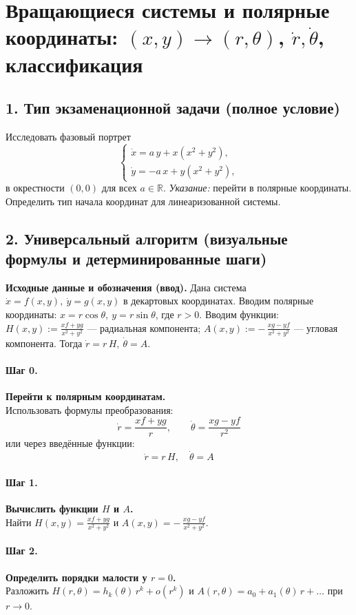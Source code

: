 \section{Вращающиеся системы и полярные координаты: \((x,y)\to(r,\theta)\), \(\dot r,\dot\theta\), классификация}

\subsection*{1. Тип экзаменационной задачи (полное условие)}
Исследовать фазовый портрет
\[
\begin{cases}
\dot{x}=a\,y+x(x^{2}+y^{2}),\\
\dot{y}=-a\,x+y(x^{2}+y^{2}),
\end{cases}
\]
в окрестности \((0,0)\) для всех \(a\in\mathbb R\). \textit{Указание:} перейти в полярные координаты. Определить тип начала координат для линеаризованной системы.

\subsection*{2. Универсальный алгоритм (визуальные формулы и детерминированные шаги)}

\textbf{Исходные данные и обозначения (ввод).} Дана система \(\dot x=f(x,y),\ \dot y=g(x,y)\) в декартовых координатах.
Вводим полярные координаты: \(x=r\cos\theta,\ y=r\sin\theta\), где \(r>0\).
Вводим функции: \(H(x,y):=\frac{x f+y g}{x^{2}+y^{2}}\) — радиальная компонента; \(A(x,y):=-\,\frac{x g-y f}{x^{2}+y^{2}}\) — угловая компонента.
Тогда \(\dot r=r\,H,\ \dot\theta=A\).

\paragraph{Шаг 0.} \textbf{Перейти к полярным координатам.}\\
Использовать формулы преобразования:
\[
\boxed{\ \dot r=\frac{x f+y g}{r},\qquad \dot\theta=\frac{x g-y f}{r^{2}}\ }
\]
или через введённые функции:
\[
\boxed{\ \dot r=r\,H,\quad \dot\theta=A\ }
\]

\paragraph{Шаг 1.} \textbf{Вычислить функции \(H\) и \(A\).}\\
Найти \(H(x,y)=\frac{x f+y g}{x^{2}+y^{2}}\) и \(A(x,y)=-\,\frac{x g-y f}{x^{2}+y^{2}}\).

\paragraph{Шаг 2.} \textbf{Определить порядки малости у \(r=0\).}\\
Разложить \(H(r,\theta)=h_k(\theta)\,r^{k}+o(r^{k})\) и \(A(r,\theta)=a_0+ a_1(\theta)\,r+\dots\) при \(r\to 0\).

